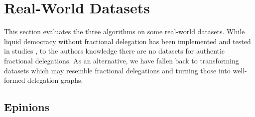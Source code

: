 %
%
%
%
%

\section{Real-World Datasets}

This section evaluates the three algorithms on some real-world datasets. While liquid democracy without fractional delegation has been implemented and tested in studies , to the authors knowledge there are no datasets for authentic fractional delegations. As an alternative, we have fallen back to transforming datasets which may resemble fractional delegations and turning those into well-formed delegation graphs. 

\subsection{Epinions}

